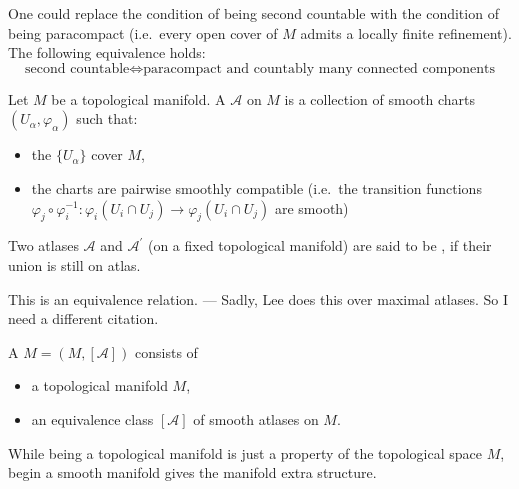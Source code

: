 \documentclass[a4paper,11pt]{article}
\begin{document}
\begin{remark}
    One could replace the condition of being second countable with the condition of being paracompact (i.e.\ every open cover of \(M\) admits a locally finite refinement). The following equivalence holds:
    \[\text{second countable}\iff \text{paracompact and countably many connected components}\]
\end{remark}

\begin{definition}
    Let \(M\) be a topological manifold. A  \(\mathcal{A}\) on \(M\) is a collection of smooth charts \((U_\alpha,\varphi_\alpha)\) such that:
    \begin{itemize}
        \item the \(\{U_\alpha\}\) cover \(M\),
        \item the charts are pairwise smoothly compatible (i.e.\ the transition functions \(\varphi_j \circ \varphi_i^{-1}:\varphi_i(U_i\cap U_j)\to\varphi_j(U_i\cap U_j)\) are smooth)
    \end{itemize}
\end{definition}

\begin{definition}
    Two atlases \(\mathcal{A}\) and \(\mathcal{A}^\prime\) (on a fixed topological manifold) are said to be , if their union is still on atlas.
\end{definition}

This is an equivalence relation. --- Sadly, Lee does this over maximal atlases. So I need a different citation.

\begin{definition}
    A  \(M=(M,[\mathcal{A}])\) consists of
    \begin{itemize}
        \item a topological manifold \(M\),
        \item an equivalence class \([\mathcal{A}]\) of smooth atlases on \(M\).
    \end{itemize}
\end{definition}

\begin{remark}
    While being a topological manifold is just a property of the topological space \(M\), begin a smooth manifold gives the manifold extra structure.
\end{remark}
\end{document}
